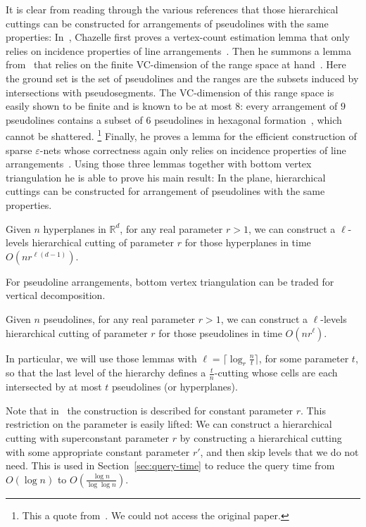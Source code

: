   It is clear from reading through the various references that those
  hierarchical cuttings can be constructed for arrangements of pseudolines with
  the same properties:
  In~\cite{C93},
  Chazelle first proves a vertex-count estimation lemma
  that only relies on incidence properties of line
  arrangements~\cite[Lemma~2.1]{C93}. Then he summons a lemma from~\cite{Ma93}
  that relies on the finite VC-dimension of the range space at
  hand~\cite[Lemma 3.1]{C93}.
  Here the ground set is the set of pseudolines and the ranges are the
  subsets induced by intersections with pseudosegments.
  The VC-dimension of this range space
  is easily shown to be finite and is known to be at most
  \(8\): every arrangement of \(9\) pseudolines contains a subset of
  \(6\) pseudolines in hexagonal formation~\cite{HM94}, which cannot be
  shattered.%
  \footnote{This a quote from~\cite{BMP05}. We could not access
  the original paper.}
  Finally, he proves a lemma for the efficient construction of
  sparse \(\varepsilon\)-nets whose correctness again only relies on incidence
  properties of line arrangements~\cite[Lemma 3.2]{C93}.
  Using those three lemmas together with bottom vertex triangulation he is
  able to prove his main result:
\else%
In the plane, hierarchical cuttings can be
constructed for arrangement of pseudolines with the same properties.
\fi

\ifjournal
\begin{lemma}\label{lem:hierarchical-cutting-d}
  Given \(n\) hyperplanes in \(\mathbb{R}^d\), for any real parameter \(r >
  1\), we can construct a \(\ell\)-levels hierarchical cutting of parameter
  \(r\) for those hyperplanes in time \(O(nr^{\ell(d-1)})\).
\end{lemma}

For pseudoline arrangements, bottom vertex triangulation can be traded for
vertical decomposition.
\begin{lemma}\label{lem:hierarchical-cutting-2}
  Given \(n\) pseudolines, for any real parameter \(r > 1\), we can construct
  a \(\ell\)-levels hierarchical cutting of parameter
  \(r\) for those pseudolines in time \(O(nr^\ell)\).
\end{lemma}

In particular, we will use those lemmas with
\(\ell = \lceil \log_r \frac nt \rceil\),
for some parameter \(t\),
so that the last level of the hierarchy defines a \(\frac
tn\)-cutting whose cells are each intersected by at most \(t\) pseudolines (or
hyperplanes).

Note that in~\cite{C93} the construction is described for constant
parameter \(r\).
This restriction on the parameter is easily lifted:
We can construct a hierarchical
cutting with superconstant parameter \(r\) by constructing a hierarchical
cutting with some appropriate constant parameter \(r'\), and then skip levels that we do
not need. This is used in Section~\ref{sec:query-time} to reduce the query time
from \(O(\log n)\) to \(O(\frac{\log n}{\log \log n})\).
\fi
